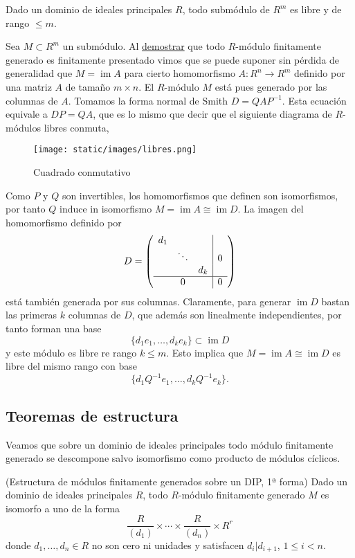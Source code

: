 
Dado un dominio de ideales principales \(R\), todo submódulo de \(R^m\)
es libre y de rango \(\leq m\). 


Sea \(M\subset R^m\) un submódulo. Al
\protect\hyperlink{fgfp}{demostrar} que todo \(R\)-módulo finitamente
generado es finitamente presentado vimos que se puede suponer sin
pérdida de generalidad que \(M=\operatorname{im}A\) para cierto
homomorfismo \(A\colon R^n\rightarrow R^m\) definido por una matriz
\(A\) de tamaño \(m\times n\). El \(R\)-módulo \(M\) está pues generado
por las columnas de \(A\). Tomamos la forma normal de Smith
\(D=QAP^{-1}\). Esta ecuación equivale a \(DP=QA\), que es lo mismo que
decir que el siguiente diagrama de \(R\)-módulos libres conmuta,

\begin{figure}
\centering
\texttt{[image: static/images/libres.png]}
\caption{Cuadrado conmutativo}
\end{figure}

Como \(P\) y \(Q\) son invertibles, los homomorfismos que definen son
isomorfismos, por tanto \(Q\) induce in isomorfismo
\(M=\operatorname{im}A\cong \operatorname{im}D\). La imagen del
homomorfismo definido por\\
\[
D=\left( \begin{array}{ccc|c} d_1&&&\cr &\ddots&&0\cr &&d_k&\cr \hline &0&&0 \end{array} \right)
\] está también generada por sus columnas. Claramente, para generar
\(\operatorname{im} D\) bastan las primeras \(k\) columnas de \(D\), que
además son linealmente independientes, por tanto forman una base
\[\{d_1e_1,\dots, d_ke_k\}\subset \operatorname{im} D\] y este módulo
es libre re rango \(k\leq m\). Esto implica que
\(M=\operatorname{im}A\cong \operatorname{im} D\) es libre del mismo
rango con base \[\{d_1Q^{-1}e_1,\dots, d_kQ^{-1}e_k\}.\] 

\hypertarget{teoremas-de-estructura}{%
\subsection{Teoremas de estructura}\label{teoremas-de-estructura}}

Veamos que sobre un dominio de ideales principales todo módulo
finitamente generado se descompone salvo isomorfismo como producto de
módulos cíclicos.

\textrm{\normalfont (Estructura de módulos finitamente generados sobre un DIP, 1ª forma)}
Dado un dominio de ideales principales \(R\), todo \(R\)-módulo
finitamente generado \(M\) es isomorfo a uno de la forma
\[\frac{R}{(d_1)}\times \cdots \times\frac{R}{(d_n)}\times R^{r}\]
donde \(d_1,\dots,d_n\in R\) no son cero ni unidades y satisfacen
\(d_i|d_{i+1}\), \(1\leq i{<}n\). 

